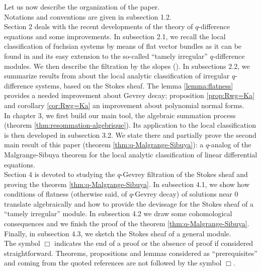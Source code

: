 \documentclass[english]{smfart}
\numberwithin{equation}{thm}
\begin{document}
Let us now describe the organization of the paper.\\

Notations and conventions  are given in subsection 1.2. \\

Section 2 deals with the recent developments of the theory of
$q$-difference equations and some improvements. In
subsection 2.1, we recall the local classification of fuchsian
systems by means of flat vector bundles as it can be  found in
\cite{JSGAL} and its easy extension to the so-called ``tamely irregular'' 
$q$-difference modules. We then describe the filtration
by the slopes (\cite{JSFIL}). In subsections 2.2, we summarize results 
from \cite{RSZ} about the local
analytic classification of irregular $q$-difference systems,
based on the Stokes sheaf. The lemma \ref{lemma:flatness}
provides a needed improvement about Gevrey decay;
proposition \ref{prop:Rwg=Ka}  and corollary \ref{cor:Rwg=Ka} an
improvement about polynomial normal forms. \\

In chapter 3, we first build our main tool, the algebraic
summation process (theorem \ref{thm:resommation-algebrique}). Its
application to the local classification is then developed in
subsection 3.2. We state there and partially prove the second main
result of this paper (theorem \ref{thm:q-Malgrange-Sibuya}): a
$q$-analog of the Malgrange-Sibuya theorem for the
local analytic classification of linear differential equations.\\


Section 4 is devoted to studying the $q$-Gevrey filtration of the
Stokes sheaf and proving the theorem \ref{thm:q-Malgrange-Sibuya}. 
In subsection 4.1, we show how conditions of flatness (otherwise said, 
of $q$-Gevrey decay) of solutions near
$0$ translate algebraically and how to provide the devissage for
the Stokes sheaf of a ``tamely irregular'' module. In subsection
4.2 we draw some cohomological consequences and we finish the
proof of the theorem \ref{thm:q-Malgrange-Sibuya}. Finally, in
subsection 4.3, we sketch the Stokes sheaf of a general module.\\


The symbol $\Box$  indicates the end of a proof or the absence of
proof if considered straightforward. Theorems,
propositions and lemmas considered as ``prerequisites'' and coming
from the quoted references are not followed by the symbol $\Box$.
\\
\end{document}
